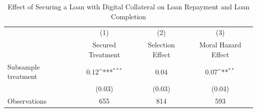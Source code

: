 \begin{table}[htbp]\centering
\def\sym#1{\ifmmode^{#1}\else\(^{#1}\)\fi}
\caption{Effect of Securing a Loan with Digital Collateral on Loan Repayment and Loan Completion\label{LASMH\_repay\_ITT\_150}}
\begin{tabular}{l*{3}{c}}
\toprule
                    &\multicolumn{1}{c}{(1)}&\multicolumn{1}{c}{(2)}&\multicolumn{1}{c}{(3)}\\
                    &\multicolumn{1}{c}{Secured Treatment}&\multicolumn{1}{c}{Selection Effect}&\multicolumn{1}{c}{Moral Hazard Effect}\\
\midrule
Subsample treatment &        0.12\sym{***}&        0.04         &        0.07\sym{**} \\
                    &      (0.03)         &      (0.03)         &      (0.04)         \\
\midrule
Observations        &         655         &         814         &         593         \\
\bottomrule
\end{tabular}
\end{table}
